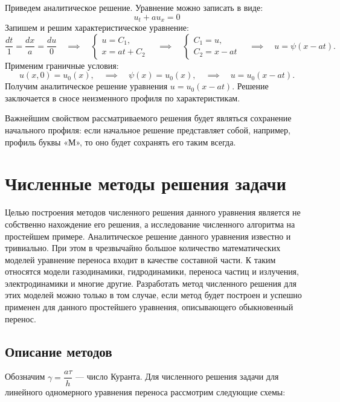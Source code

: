 \documentclass[12pt, a4paper]{article}
\begin{document}
Приведем аналитическое решение. Уравнение можно записать в виде:
\begin{equation*}
	u_t + a u_x = 0
\end{equation*}
Запишем и решим характеристическое уравнение:
\begin{equation*}
	\dfrac{dt}{1} = \dfrac{dx}{a} = \dfrac{du}{0} \quad \implies  \quad 
	\begin{cases}
		u = C_1,\\
		x = a t + C_2
	\end{cases} 
	\quad \implies \quad
	\begin{cases}
		C_1 = u,\\
		C_2 = x - at
	\end{cases}
	 \quad \implies \quad
	 u = \psi(x-a t).
\end{equation*}
Применим граничные условия:
\begin{equation*}
	u(x, 0) = u_0(x),
	\quad \implies \quad
	\psi(x) = u_0(x),
	 \quad \implies \quad
	 u = u_0(x-a t).
\end{equation*}
Получим аналитическое решение уравнения $u = u_0(x-at)$. Решение заключается в сносе неизменного профиля по характеристикам. 

Важнейшим свойством рассматриваемого решения будет являться сохранение начального профиля: если начальное решение представляет собой, например, профиль буквы «М», то оно будет сохранять его таким всегда.

\section{Численные методы решения задачи}
Целью построения методов численного решения данного уравнения является не собственно нахождение его решения, а исследование численного алгоритма на простейшем примере. Аналитическое решение данного уравнения известно и тривиально. При этом в чрезвычайно большое количество математических моделей уравнение переноса входит в качестве составной части. К таким относятся модели газодинамики, гидродинамики, переноса частиц и излучения, электродинамики и многие другие. Разработать метод численного решения для этих моделей можно только в том случае, если метод будет построен и успешно применен для данного простейшего уравнения, описывающего обыкновенный перенос.\cite{1}
\subsection{Описание методов}
Обозначим $\gamma =  \dfrac{a \tau}{h}$ --- число Куранта. Для численного решения задачи для линейного одномерного уравнения переноса рассмотрим следующие схемы:
\end{document}
